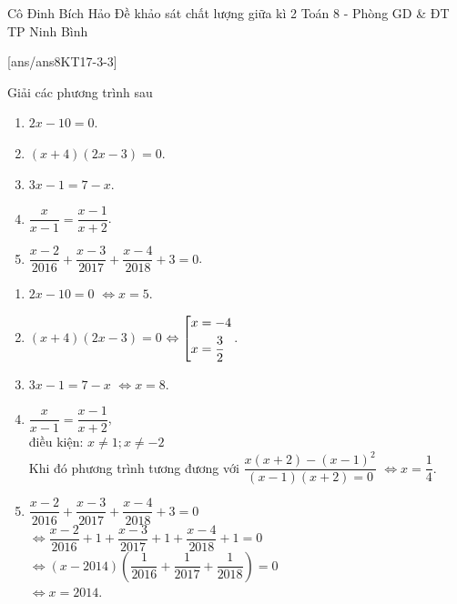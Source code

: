 \begin{name}
{Cô Đinh Bích Hảo}
{Đề khảo sát chất lượng giữa kì 2 Toán 8 - Phòng GD \& ĐT TP Ninh Bình}
\end{name}
\setcounter{ex}{0}
[ans/ans8KT17-3-3]
\begin{ex}%
   Giải các phương trình sau
  \begin{multicols}{2}
    \begin{enumerate}    
        \item  $2x-10=0$.
        \item $(x+4)(2x-3)=0$.
        \item $3x-1=7-x$.
        \item $\dfrac{x}{x-1}=\dfrac{x-1}{x+2}$.
        \item $\dfrac{x-2}{2016}+\dfrac{x-3}{2017}+\dfrac{x-4}{2018}+3=0$.
    \end{enumerate}
    \end{multicols}
\loigiai
    {
      \begin{multicols}{2}
 \begin{enumerate}    
        \item  $2x-10=0$ $\Leftrightarrow x=5$.
        \item $(x+4)(2x-3)=0$ $\Leftrightarrow \left[\begin{aligned}x&=-4\\x&=\frac{3}{2}\end{aligned}\right.$.
        \item $3x-1=7-x$ $\Leftrightarrow x=8$.
        \item $\dfrac{x}{x-1}=\dfrac{x-1}{x+2}$,\\
        điều kiện: $x \ne 1; x \ne -2$\\
        Khi đó phương trình tương đương với $\dfrac{x(x+2)-(x-1)^2}{(x-1)(x+2)=0}$
         $\Leftrightarrow x=\dfrac{1}{4}$.
        \item $\dfrac{x-2}{2016}+\dfrac{x-3}{2017}+\dfrac{x-4}{2018}+3=0$\\
         $\Leftrightarrow \dfrac{x-2}{2016}+1+\dfrac{x-3}{2017}+1+\dfrac{x-4}{2018}+1=0$\\
         $\Leftrightarrow (x-2014)\left(\dfrac{1}{2016}+\dfrac{1}{2017}+\dfrac{1}{2018}\right)=0$\\
         $\Leftrightarrow x=2014$.
    \end{enumerate}
    \end{multicols}
    }
\end{ex}

